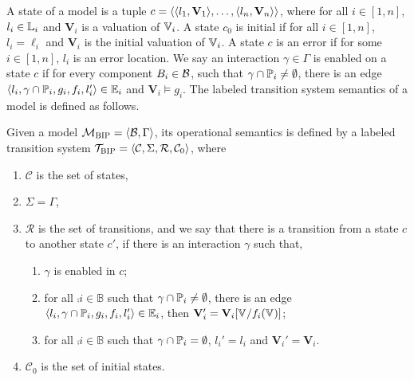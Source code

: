 A state of a \BIP model is a tuple $c = \langle \langle l_{1}, \mathbf{V}_{1} \rangle, \ldots, \langle l_{n}, \mathbf{V}_{n} \rangle \rangle $,
 where for all $i \in [1,n] $, $l_i \in \mathbb{L}_{i} $ and $\mathbf{V}_i $ is a valuation of $\mathbb{V}_{i}$.
%
A state $c_{0}$ is initial if for all $i \in [1,n]$,
$l_i = \ell_{i}$ and $\mathbf{V}_{i}$ is the initial valuation of $\mathbb{V}_{i}$.
%
A state $c$ is an error if for some $i \in [1,n]$, $l_{i}$ is an error location.
%
We say an interaction $\gamma \in \Gamma$ is enabled on a state $c$ if
 for every component $B_{i} \in \mathcal{B}$,
 such that $\gamma \cap \mathbb{P}_{i} \neq \emptyset$,
%
 there is an edge $\langle{l_i, \gamma \cap \ensuremath{\mathbb{P}_{i}}, g_i, f_i, l_{i}' }\rangle \in \mathbb{E}_{i}$
 and  $\mathbf{V}_{i} \models g_i $.
%
The labeled transition system semantics of a \BIP model is defined as follows.

\begin{definition} 
\label{operational-semantics}
Given a \BIP model $\mathcal{M}_{\textsc{BIP}}=\langle{\ensuremath{\mathcal{B}},\Gamma}\rangle$,
 its operational semantics is defined by a labeled transition system
 $\mathcal{T}_{\textsc{BIP}} = \langle{\mathcal{C}, \Sigma, \mathcal{R}, \mathcal{C}_{0}}\rangle$, where
%
\begin{enumerate}
\item $\mathcal{C}$ is the set of states,
\item $\Sigma = \Gamma $,
\item $\mathcal{R}$ is the set of transitions,
  and we say that there is a transition from a state $c$
  to another state $c'$,
  if there is an interaction $\gamma $ such that,
%
\begin{enumerate}
  \item $\gamma$ is enabled in $c$;
  \item for all $\comp{i} \in \mathbb{B}$ such that
    $\gamma \cap \mathbb{P}_{i} \neq \emptyset$, there is an edge
    $\langle{l_i, \gamma \cap \ensuremath{\mathbb{P}_{i}}, g_i, f_i, l_i'}\rangle \in \mathbb{E}_{i} $,
    then $\mathbf{V}'_{i} = \mathbf{V}_{i}[\mathbb{V}_{} / f_i(\mathbb{V}_{})]$;
  \item for all $\comp{i} \in \mathbb{B} $ such that
    $\gamma \cap \mathbb{P}_{i} = \emptyset $,
    $l_i' = l_i$ and $\mathbf{V}_i' = \mathbf{V}_i$.
\end{enumerate}
\item $\mathcal{C}_{0}$ is the set of initial states.
\end{enumerate}
\end{definition}

